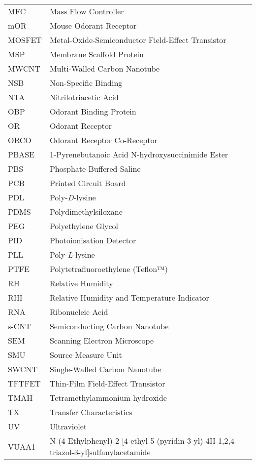 \newpage
\pagestyle{plain} %
\begin{table}[h]
  \begin{tabular}{@{}p{} p{}@{}}  %
    MFC  & Mass Flow Controller   \\
    mOR  & Mouse Odorant Receptor  \\
    MOSFET  & Metal-Oxide-Semiconductor Field-Effect Transistor  \\
    MSP  & Membrane Scaffold Protein  \\
    MWCNT  & Multi-Walled Carbon Nanotube   \\
    NSB  & Non-Specific Binding   \\
    NTA  & Nitrilotriacetic Acid   \\
    OBP  & Odorant Binding Protein  \\
    OR  & Odorant Receptor  \\
    ORCO  & Odorant Receptor Co-Receptor  \\
    PBASE  & 1-Pyrenebutanoic Acid N-hydroxysuccinimide Ester  \\ 
    PBS  & Phosphate-Buffered Saline  \\
    PCB  & Printed Circuit Board   \\
    PDL & Poly-\textit{D}-lysine  \\
    PDMS  & Polydimethylsiloxane   \\  
    PEG  & Polyethylene Glycol  \\ 
    PID  & Photoionisation Detector  \\ 
    PLL  & Poly-\textit{L}-lysine  \\
    PTFE  & Polytetrafluoroethylene (Teflon™)  \\
    RH  & Relative Humidity  \\
    RHI  & Relative Humidity and Temperature Indicator  \\
    RNA  & Ribonucleic Acid   \\ 
    s-CNT  & Semiconducting Carbon Nanotube   \\
    SEM  & Scanning Electron Microscope   \\
    SMU  & Source Measure Unit   \\
    SWCNT  & Single-Walled Carbon Nanotube   \\
    TFTFET  & Thin-Film Field-Effect Transistor  \\
    TMAH  & Tetramethylammonium hydroxide  \\
    TX  & Transfer Characteristics  \\
    UV  & Ultraviolet \\
    VUAA1  & N-(4-Ethylphenyl)-2-{[4-ethyl-5-(pyridin-3-yl)-4H-1,2,4-triazol-3-yl]sulfanyl}acetamide  \\ 
  \end{tabular}
\end{table}

\clearpage
\newpage
\thispagestyle{empty} %
\mbox{~}
\clearpage
\newpage


